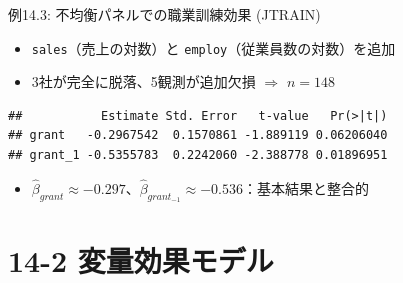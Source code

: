 \documentclass[
  ignorenonframetext,
]{beamer}
\newenvironment{Shaded}{\begin{snugshade}}{\end{snugshade}}
\newcommand{\AttributeTok}[1]{\textcolor[rgb]{0.13,0.29,0.53}{#1}}
\newcommand{\FunctionTok}[1]{\textcolor[rgb]{0.13,0.29,0.53}{\textbf{#1}}}
\newcommand{\NormalTok}[1]{#1}
\newcommand{\OtherTok}[1]{\textcolor[rgb]{0.56,0.35,0.01}{#1}}
\newcommand{\SpecialCharTok}[1]{\textcolor[rgb]{0.81,0.36,0.00}{\textbf{#1}}}
\newcommand{\StringTok}[1]{\textcolor[rgb]{0.31,0.60,0.02}{#1}}
\providecommand{\tightlist}{%
  \setlength{\itemsep}{0pt}\setlength{\parskip}{0pt}}
\begin{document}
\begin{frame}[fragile]{例14.3: 不均衡パネルでの職業訓練効果 (JTRAIN)}
\label{ux4f8b14.3-ux4e0dux5747ux8861ux30d1ux30cdux30ebux3067ux306eux8077ux696dux8a13ux7df4ux52b9ux679c-jtrain}
\begin{itemize}
\tightlist
\item
  \texttt{sales}（売上の対数）と \texttt{employ}（従業員数の対数）を追加
\item
  3社が完全に脱落、5観測が追加欠損 \(\Rightarrow\) \(n = 148\)
\end{itemize}

\footnotesize

\begin{Shaded}
\end{Shaded}

\begin{verbatim}
##           Estimate Std. Error   t-value   Pr(>|t|)
## grant   -0.2967542  0.1570861 -1.889119 0.06206040
## grant_1 -0.5355783  0.2242060 -2.388778 0.01896951
\end{verbatim}

\normalsize

\begin{itemize}
\tightlist
\item
  \(\hat{\beta}_{grant} \approx -0.297\)、\(\hat{\beta}_{grant_{-1}} \approx -0.536\)：基本結果と整合的
\end{itemize}
\end{frame}

\section{14-2
変量効果モデル}\label{ux5909ux91cfux52b9ux679cux30e2ux30c7ux30eb}
\end{document}
